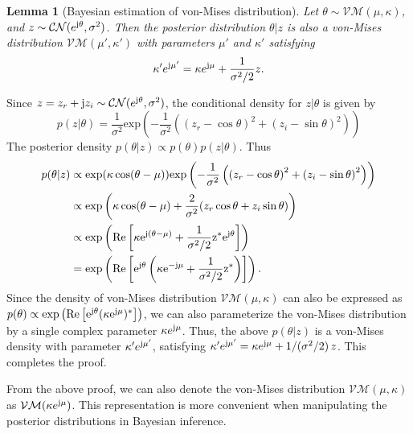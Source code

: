 \documentclass[12pt,draftclsnofoot,journal,onecolumn]{IEEEtran}
\newtheorem{lemma}{\bf Lemma}
\theoremstyle{nonumberplain}
\def \exp {\text{exp}}
\def \CN {\mathcal{CN}}
\def \VM {\mathcal{VM}}
\def \re {\rm Re}
\begin{document}
    \begin{lemma}[Bayesian estimation of von-Mises distribution]\label{lemma_1}
        Let $\theta \sim \VM(\mu, \kappa)$, and $z \sim \CN(e^{{\rm j}\theta}, \sigma^2)$. Then the posterior distribution $\theta | z$ is also a von-Mises distribution $\VM(\mu', \kappa')$ with parameters $\mu'$ and $\kappa'$ satisfying
        \begin{equation}
            \kappa' e^{{\rm j}\mu'} = \kappa e^{{\rm j}\mu} + \frac{1}{\sigma^2/2}z.
        \end{equation}
    \end{lemma}
    \begin{IEEEproof}
        Since $z=z_r + {\rm j} z_i \sim \CN(e^{{\rm j} \theta}, \sigma^2)$, the conditional density for $z|\theta$ is given by 
        \begin{equation}
            p(z|\theta) = \frac{1}{\sigma^2}\exp\left(-\frac{1}{\sigma^2}\left(\left(z_r - \cos\theta\right)^2 + \left(z_i - \sin\theta\right)^2\right)\right)
        \end{equation}
        The posterior density $p(\theta | z) \propto p(\theta)p(z|\theta)$. Thus
        \begin{equation}
            \begin{aligned}
                p(\theta|z) & \propto \exp(\kappa \cos(\theta - \mu))\exp\left(-\frac{1}{\sigma^2}\left(\left(z_r - \cos\theta\right)^2 + \left(z_i - \sin\theta\right)^2\right)\right) \\
                & \propto \exp\left( \kappa \cos(\theta - \mu) + \frac{2}{\sigma^2}(z_r \cos\theta + z_i\sin\theta) \right) \\
                & \propto \exp\left( \re\left[ \kappa e^{{\rm j} (\theta - \mu)} + \frac{1}{\sigma^2/2}z^{*} e^{{\rm j} \theta} \right] \right) \\
                & = \exp\left( \re\left[ e^{{\rm j} \theta}\left(\kappa e^{-{\rm j}\mu} + \frac{1}{\sigma^2/2} z^*\right)\right] \right).
            \end{aligned}
        \end{equation}
        Since the density of von-Mises distribution $\VM(\mu, \kappa)$ can also be expressed as $p(\theta) \propto \exp\left( \re\left[ e^{{\rm j} \theta}(\kappa e^{{\rm j} \mu})^* \right] \right)$, we can also parameterize the von-Mises distribution by a single complex parameter $\kappa e^{{\rm j}\mu}$. Thus, the above $p(\theta|z)$ is a von-Mises density with parameter $\kappa'e^{{\rm j}\mu'}$, satisfying $\kappa' e^{{\rm j}\mu'} = \kappa e^{{\rm j}\mu} + 1/(\sigma^2/2)\,z$. This completes the proof.
    \end{IEEEproof}
    From the above proof, we can also denote the von-Mises distribution $\VM(\mu, \kappa)$ as $\VM(\kappa e^{{\rm j}\mu})$. This representation is more convenient when manipulating the posterior distributions in Bayesian inference.
\end{document}
